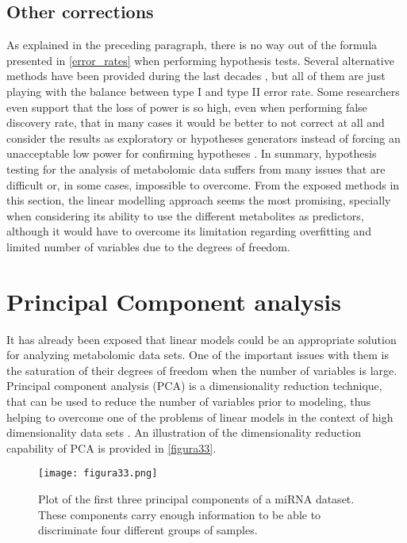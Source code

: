 \subsection{Other corrections}
As explained in the preceding paragraph, there is no way out of the formula presented in \autoref{error_rates} when performing hypothesis tests. Several alternative methods have been provided during the last decades \parencite{benjamini2001control, gao2008multiple, castro2015adjusted}, but all of them are just playing with the balance between type I and type II error rate. Some researchers even support that the loss of power is so high, even when performing false discovery rate, that in many cases it would be better to not correct at all and consider the results as exploratory or hypotheses generators instead of forcing an unacceptable low power for confirming hypotheses \parencite{bender2001adjusting}.
In summary, hypothesis testing for the analysis of metabolomic data suffers from many issues that are difficult or, in some cases, impossible to overcome. From the exposed methods in this section, the linear modelling approach seems the most promising, specially when considering its ability to use the different metabolites as predictors, although it would have to overcome its limitation regarding overfitting and limited number of variables due to the degrees of freedom. 

\section{Principal Component analysis}
\label{sec:PCA}
It has already been exposed that linear models could be an appropriate solution for analyzing metabolomic data sets. One of the important issues with them is the saturation of their degrees of freedom when the number of variables is large. Principal component analysis (PCA) is a dimensionality reduction technique, that can be used to reduce the number of variables prior to modeling, thus helping to overcome one of the problems of linear models in the context of high dimensionality data sets \parencite{hotelling1933analysis, wang2008principal}. An illustration of the dimensionality reduction capability of PCA is provided in \autoref{figura33}.


\begin{figure}[hbtp]
	\centering
\texttt{[image: figura33.png]}
\caption[Plot of the first three principal components of a miRNA dataset]{Plot of the first three principal components of a miRNA dataset. These components carry enough information to be able to discriminate four different groups of samples.}
\label{figura33}
\end{figure}

